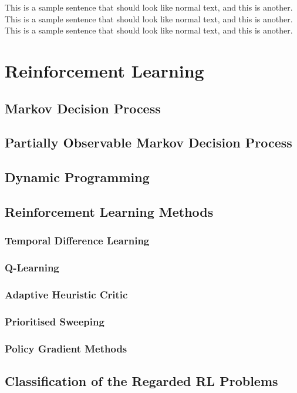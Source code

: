 \documentclass[officiallayout]{tktla}
\begin{document}
\begin{acknowledgements}
  This is a sample sentence that should look like normal text, and
  this is another. This is a sample sentence that should look like
  normal text, and this is another. This is a sample sentence that
  should look like normal text, and this is another.
\end{acknowledgements}

\tableofcontents

\mainmatter

\chapter{Reinforcement Learning}
\section{Markov Decision Process}
\section{Partially Observable Markov Decision Process}
\section{Dynamic Programming}
\section{Reinforcement Learning Methods}
\subsection{Temporal Difference Learning}
\subsection{Q-Learning}
\subsection{Adaptive Heuristic Critic}
\subsection{Prioritised Sweeping}
\subsection{Policy Gradient Methods}

\section{Classification of the Regarded RL Problems}
\end{document}
